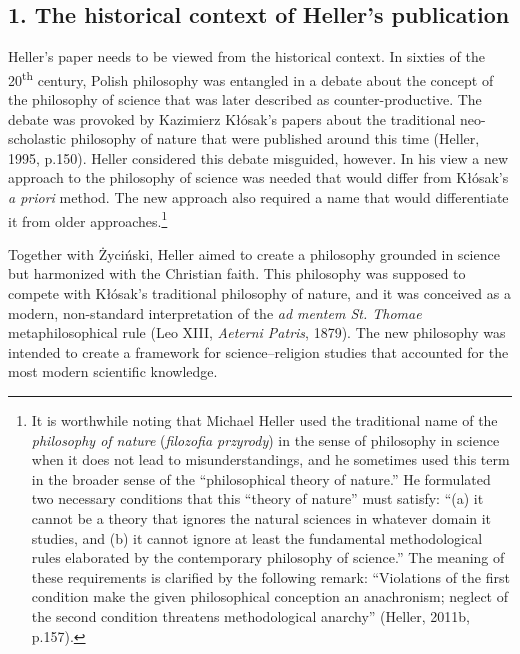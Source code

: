 \documentclass[a4paper]{article}
\begin{document}
\subsection{1. The historical context of Heller’s publication}
Heller’s paper needs to be viewed from the historical context. In sixties of the 20\textsuperscript{th} century, Polish
philosophy was entangled in a debate about the concept of the philosophy of science that was later described as
counter-productive. The debate was provoked by Kazimierz Kłósak’s papers about the traditional neo-scholastic
philosophy of nature that were published around this time (Heller, 1995, p.150). Heller considered this debate
misguided, however. In his view a new approach to the philosophy of science was needed that would differ from Kłósak’s
\textit{a priori} method. The new approach also required a name that would differentiate it from older
approaches.\footnote{It is worthwhile noting that Michael Heller used the traditional name of the \textit{philosophy of
nature }(\textit{filozofia przyrody}) in the sense of philosophy in science when it does not lead to misunderstandings,
and he sometimes used this term in the broader sense of the “philosophical theory of nature.” He formulated two
necessary conditions that this “theory of nature” must satisfy: “(a) it cannot be a theory that ignores the natural
sciences in whatever domain it studies, and (b) it cannot ignore at least the fundamental methodological rules
elaborated by the contemporary philosophy of science.” The meaning of these requirements is clarified by the following
remark: “Violations of the first condition make the given philosophical conception an anachronism; neglect of the
second condition threatens methodological anarchy” (Heller, 2011b, p.157).}

Together with Życiński, Heller aimed to create a philosophy grounded in science but harmonized with the Christian faith.
This philosophy was supposed to compete with Kłósak’s traditional philosophy of nature, and it was conceived as a
modern, non-standard interpretation of the \textit{ad mentem St. Thomae }metaphilosophical rule (Leo XIII,
\textit{Aeterni Patris}, 1879). The new philosophy was intended to create a framework for science–religion studies that
accounted for the most modern scientific knowledge. 
\end{document}
